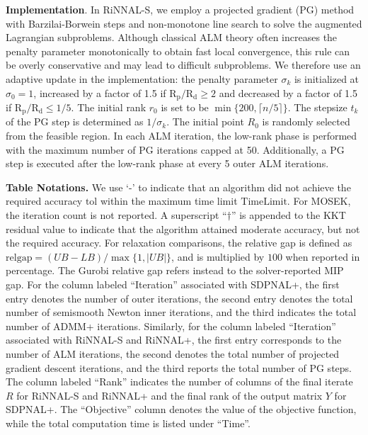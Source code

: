 \documentclass[11pt]{article}
\def\tol{\mathrm{tol}}
\def\timelimit{\mathrm{TimeLimit}}
\theoremstyle{plain}
\begin{document}
\medskip
\noindent\textbf{Implementation}. 
In RiNNAL-S, we employ a projected gradient (PG) method with Barzilai-Borwein steps and non-monotone line search to solve the augmented Lagrangian subproblems. Although classical ALM theory often increases the penalty parameter monotonically to obtain fast local convergence, this rule can be overly conservative and may lead to difficult subproblems. We therefore use an adaptive update in the implementation: the penalty parameter $\sigma_k$ is initialized at $\sigma_0 = 1$, increased by a factor of 1.5 if $\operatorname{R_p}/\operatorname{R_d}\geq 2$ and decreased by a factor of 1.5 if $\operatorname{R_p}/\operatorname{R_d}\leq 1/5$. The initial rank $r_0$ is set to be $\min\{200,\lceil n/5 \rceil \}$. The stepsize $t_k$ of the PG step is determined as $1/\sigma_k$. The initial point $R_0$ is randomly selected from the feasible region. In each ALM iteration, the low-rank phase is performed with the maximum number of PG iterations capped at 50. Additionally, a PG step is executed after the low-rank phase at every 5 outer ALM iterations.



\medskip
\noindent\textbf{Table Notations.} We use `-' to indicate that an algorithm did not achieve the required accuracy $\tol$ within the maximum time limit $\timelimit$. For MOSEK, the iteration count is not reported. 
A superscript ``$\dagger$'' is appended to the KKT residual value to indicate that the algorithm attained moderate accuracy, but not the required accuracy.
For relaxation comparisons, the relative gap is defined as $\mathrm{relgap}=(UB-LB)/\max\{1,|UB|\}$, and is multiplied by $100$ when reported in percentage. The Gurobi relative gap refers instead to the solver-reported MIP gap.
For the column labeled ``Iteration'' associated with SDPNAL+, the first entry denotes the number of outer iterations, the second entry denotes the total number of semismooth Newton inner iterations, and the third indicates the total number of ADMM+ iterations. Similarly, for the column labeled ``Iteration'' associated with RiNNAL-S and RiNNAL+, the first entry corresponds to the number of ALM iterations, the second denotes the total number of projected gradient descent 
iterations, and the third 
reports the total number of PG steps.
The column labeled ``Rank'' indicates the number of columns of the final iterate $R$ for RiNNAL-S and RiNNAL+ and the final rank of the output matrix $Y$ for SDPNAL+. 
The ``Objective'' column denotes the value of the objective function, while the total computation time is listed under ``Time''. 
\end{document}
